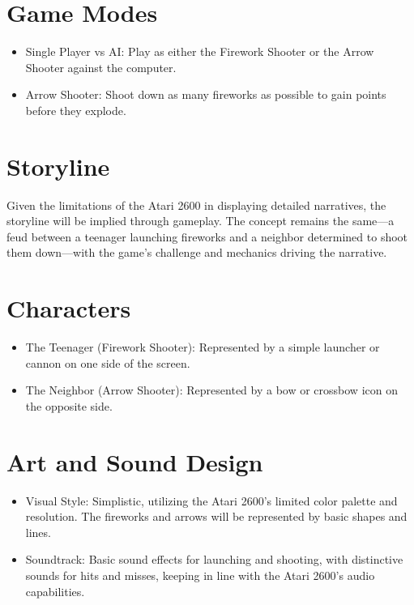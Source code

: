 \documentclass{article}
\begin{document}
\section{Game Modes}

    \begin{itemize}
      \item Single Player vs AI: Play as either the Firework Shooter or the Arrow Shooter against the computer.
      \item Arrow Shooter: Shoot down as many fireworks as possible to gain points before they explode.
    \end{itemize}


\section{Storyline}
Given the limitations of the Atari 2600 in displaying detailed narratives, the storyline will be implied through gameplay. The concept remains the same—a feud between a teenager launching fireworks and a neighbor determined to shoot them down—with the game's challenge and mechanics driving the narrative.


\section{Characters}

    \begin{itemize}
      \item The Teenager (Firework Shooter): Represented by a simple launcher or cannon on one side of the screen.
      \item The Neighbor (Arrow Shooter): Represented by a bow or crossbow icon on the opposite side.
    \end{itemize}




\section{Art and Sound Design}

    \begin{itemize}
      \item Visual Style: Simplistic, utilizing the Atari 2600's limited color palette and resolution. The fireworks and arrows will be represented by basic shapes and lines.
      \item Soundtrack: Basic sound effects for launching and shooting, with distinctive sounds for hits and misses, keeping in line with the Atari 2600's audio capabilities.
    \end{itemize}
\end{document}
